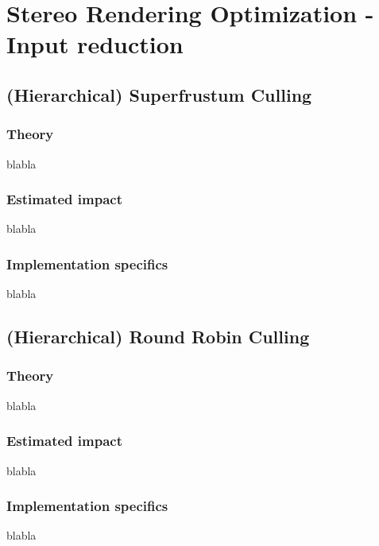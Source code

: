 
\chapter{Stereo Rendering Optimization - Input reduction}

\section{(Hierarchical) Superfrustum Culling}
\subsection{Theory}
blabla
\subsection{Estimated impact}
blabla
\subsection{Implementation specifics}
blabla

\section{(Hierarchical) Round Robin Culling}
\subsection{Theory}
blabla
\subsection{Estimated impact}
blabla
\subsection{Implementation specifics}
blabla
